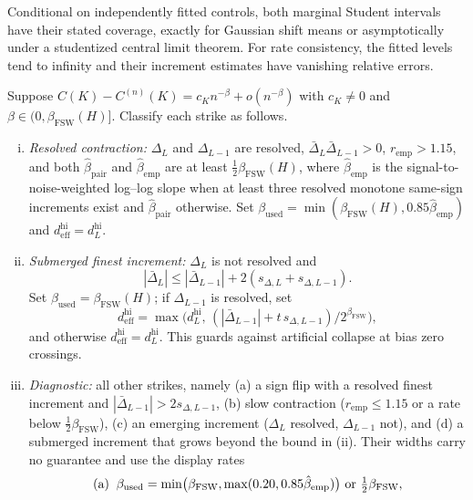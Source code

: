 \begin{assumption}\label{assump:shift} Conditional on independently fitted controls, both marginal Student intervals have their stated coverage, exactly for Gaussian shift means or asymptotically under a studentized central limit theorem. For rate consistency, the fitted levels tend to infinity and their increment estimates have vanishing relative errors.\end{assumption}
\begin{theorem}
\label{thm:bridge_envelope}
Suppose $C(K)-C^{(n)}(K) = c_K n^{-\beta} + o(n^{-\beta})$ with $c_K\neq 0$ and $\beta\in(0,\beta_{\mathrm{FSW}}(H)]$. Classify each strike as follows.
\begin{enumerate}[(i)]
  \item \emph{Resolved contraction:} $\Delta_L$ and $\Delta_{L-1}$ are resolved, $\bar{\Delta}_L\bar{\Delta}_{L-1}>0$, $r_{\mathrm{emp}}>1.15$, and both $\hat{\beta}_{\mathrm{pair}}$ and $\hat{\beta}_{\mathrm{emp}}$ are at least $\tfrac12\beta_{\mathrm{FSW}}(H)$, where $\hat{\beta}_{\mathrm{emp}}$ is the signal-to-noise-weighted log--log slope when at least three resolved monotone same-sign increments exist and $\hat{\beta}_{\mathrm{pair}}$ otherwise. Set $\beta_{\mathrm{used}}=\min(\beta_{\mathrm{FSW}}(H),0.85\hat{\beta}_{\mathrm{emp}})$ and $d_{\mathrm{eff}}^{\mathrm{hi}}=d_L^{\mathrm{hi}}$.
  \item \emph{Submerged finest increment:} $\Delta_L$ is not resolved and
  \[
    |\bar{\Delta}_L|\le |\bar{\Delta}_{L-1}|+2(s_{\Delta,L}+s_{\Delta,L-1}).
  \]
  Set $\beta_{\mathrm{used}}=\beta_{\mathrm{FSW}}(H)$; if $\Delta_{L-1}$ is resolved, set
  \[
    d_{\mathrm{eff}}^{\mathrm{hi}}=\max\bigl(d_L^{\mathrm{hi}},\,(|\bar{\Delta}_{L-1}|+t\,s_{\Delta,L-1})/2^{\beta_{\mathrm{FSW}}}\bigr),
  \]
  and otherwise $d_{\mathrm{eff}}^{\mathrm{hi}}=d_L^{\mathrm{hi}}$. This guards against artificial collapse at bias zero crossings.
  \item \emph{Diagnostic:} all other strikes, namely (a) a sign flip with a resolved finest increment and $|\bar{\Delta}_{L-1}|>2s_{\Delta,L-1}$, (b) slow contraction ($r_{\mathrm{emp}}\le1.15$ or a rate below $\tfrac12\beta_{\mathrm{FSW}}$), (c) an emerging increment ($\Delta_L$ resolved, $\Delta_{L-1}$ not), and (d) a submerged increment that grows beyond the bound in (ii). Their widths carry no guarantee and use the display rates
  \[
    \begin{aligned}
    \text{(a)}\;\;&\beta_{\mathrm{used}}=\min\bigl(\beta_{\mathrm{FSW}},\max(0.20,0.85\hat{\beta}_{\mathrm{emp}})\bigr) \TCbr \text{ or }\tfrac12\beta_{\mathrm{FSW}},\\

\end{aligned}\]
\end{enumerate}
\end{theorem}
